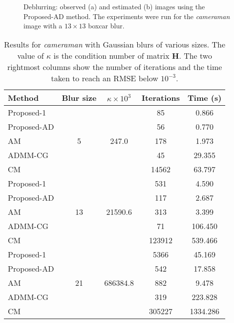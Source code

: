 \documentclass[10pt,twocolumn,twoside]{IEEEtran}
\newcommand{\Hm}{\mathbf{H}} %
\begin{document}
\begin{figure}[!t]
		\vspace{-10pt}
	\centering
	\hfil
	\caption{Deblurring: observed (a) and estimated (b) images using the Proposed-AD method. The experiments were run for the \textit{cameraman} image with a $13 \times 13$ boxcar blur.}
	\label{fig:cameraman}
		\vspace{-15pt}
\end{figure}

\begin{table}
	\renewcommand{\arraystretch}{1}
	\caption{Results for \textit{cameraman} with Gaussian blurs of various sizes. The value of $\kappa$ is the condition number of matrix $\Hm$. The two rightmost columns show the number of iterations and the time taken to reach an RMSE below $10^{-3}$.}
	\label{tab:results}
	\centering
\begin{tabular}{l|c|c|c|c}
Method &Blur size &$\kappa \times 10^3$ &Iterations &Time (s) \\
\hline
Proposed-1 & \multirow{5}{*}{5} & \multirow{5}{*}{247.0} &   85 & 0.866  \\
Proposed-AD & & &   56 & 0.770 \\
AM & & &  178 & 1.973 \\
ADMM-CG & & &   45 & 29.355 \\
CM & & & 14562 & 63.797 \\
\hline
Proposed-1 & \multirow{5}{*}{13} & \multirow{5}{*}{21590.6} &  531 & 4.590  \\
Proposed-AD & & &  117 & 2.687 \\
AM & & &  313 & 3.399 \\
ADMM-CG & & &   71 & 106.450 \\
CM & & & 123912 & 539.466 \\
\hline
Proposed-1 & \multirow{5}{*}{21} & \multirow{5}{*}{686384.8} & 5366 & 45.169  \\
Proposed-AD & & &  542 & 17.858 \\
AM & & &  882 & 9.478 \\
ADMM-CG & & &  319 & 223.828 \\
CM & & & 305227 & 1334.286 \\
\hline
\end{tabular}
\end{table}
\end{document}
